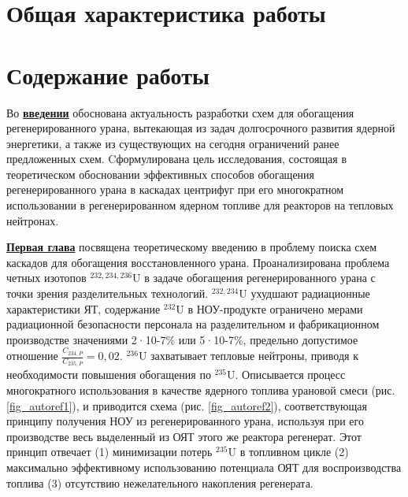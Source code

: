 \section*{Общая характеристика работы}

\newcommand{\actuality}{\underline{\textbf{\actualityTXT}}}
\newcommand{\progress}{\underline{\textbf{\progressTXT}}}
\newcommand{\aim}{\underline{{\textbf\aimTXT}}}
\newcommand{\tasks}{\underline{\textbf{\tasksTXT}}}
\newcommand{\novelty}{\underline{\textbf{\noveltyTXT}}}
\newcommand{\influence}{\underline{\textbf{\influenceTXT}}}
\newcommand{\methods}{\underline{\textbf{\methodsTXT}}}
\newcommand{\defpositions}{\underline{\textbf{\defpositionsTXT}}}
\newcommand{\reliability}{\underline{\textbf{\reliabilityTXT}}}
\newcommand{\probation}{\underline{\textbf{\probationTXT}}}
\newcommand{\contribution}{\underline{\textbf{\contributionTXT}}}
\newcommand{\publications}{\underline{\textbf{\publicationsTXT}}}



\section*{Содержание работы}
Во \underline{\textbf{введении}} обоснована актуальность разработки схем для обогащения регенерированного урана, вытекающая из задач долгосрочного развития ядерной энергетики, а также из существующих на сегодня ограничений ранее предложенных схем. Cформулирована цель исследования, состоящая в теоретическом обосновании эффективных способов обогащения регенерированного урана в каскадах цен­трифуг при его многократном использовании в регенерированном ядерном топливе для реакторов на тепловых нейтронах.

\underline{\textbf{Первая глава}} посвящена теоретическому введению в проблему поиска схем каскадов для обогащения восстановленного урана. Проанализирована проблема четных изотопов $^{232,234,236}$U в задаче обогащения регенерированного урана с точки зрения разделительных технологий. $^{232,234}$U ухудшают радиационные характеристики ЯТ, содержание $^{232}$U в НОУ-продукте ограничено мерами радиационной безопасности персонала на разделительном и фабрикационном производстве значениями 2·10-7\% или 5·10-7\%, предельно допустимое отношение $\frac{C_{234,{P}}}{C_{235,{P}}} = 0,02$. $^{236}$U захватывает тепловые нейтроны, приводя к необходимости повышения обогащения по $^{235}$U. Описывается процесс многократного использования в качестве ядерного топлива урановой смеси (рис. \ref{fig_autoref1}), и приводится схема (рис. \ref{fig_autoref2}), соответствующая принципу получения НОУ из регенерированного урана, используя при его производстве весь выделенный из ОЯТ этого же реактора регенерат. Этот принцип отвечает (1) минимизации потерь  $^{235}$U в топливном цикле (2) максимально эффективному использованию потенциала ОЯТ для воспроизвод­ства топлива (3) отсутствию нежелательного накопления регенерата.

